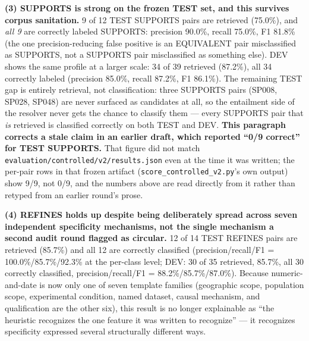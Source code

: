 \textbf{(3) SUPPORTS is strong on the frozen TEST set, and this survives
corpus sanitation.} 9 of 12 TEST SUPPORTS pairs are retrieved (75.0\%),
and \emph{all 9} are correctly labeled SUPPORTS: precision 90.0\%,
recall 75.0\%, F1 81.8\% (the one precision-reducing false positive is
an EQUIVALENT pair misclassified as SUPPORTS, not a SUPPORTS pair
misclassified as something else). DEV shows the same profile at a
larger scale: 34 of 39 retrieved (87.2\%), all 34 correctly labeled
(precision 85.0\%, recall 87.2\%, F1 86.1\%). The remaining TEST gap is
entirely retrieval, not classification: three SUPPORTS pairs (SP008,
SP028, SP048) are never surfaced as candidates at all, so the
entailment side of the resolver never gets the chance to classify them
--- every SUPPORTS pair that \emph{is} retrieved is classified
correctly on both TEST and DEV. \textbf{This paragraph corrects a stale
claim in an earlier draft, which reported ``0/9 correct'' for TEST
SUPPORTS.} That figure did not match
\texttt{evaluation/controlled/v2/results.json} even at the time it was
written; the per-pair rows in that frozen artifact (\texttt{score\_controlled\_v2.py}'s
own output) show 9/9, not 0/9, and the numbers above are read directly
from it rather than retyped from an earlier round's prose.

\textbf{(4) REFINES holds up despite being deliberately spread across
seven independent specificity mechanisms, not the single mechanism a
second audit round flagged as circular.} 12 of 14 TEST REFINES pairs are
retrieved (85.7\%) and all 12 are correctly classified (precision/recall/F1
= 100.0\%/85.7\%/92.3\% at the per-class level; DEV: 30 of 35 retrieved,
85.7\%, all 30 correctly classified, precision/recall/F1 =
88.2\%/85.7\%/87.0\%). Because
numeric-and-date is now only one of seven template families (geographic
scope, population scope, experimental condition, named dataset, causal
mechanism, and qualification are the other six), this result is no
longer explainable as ``the heuristic recognizes the one feature it was
written to recognize'' --- it recognizes specificity expressed several
structurally different ways.

